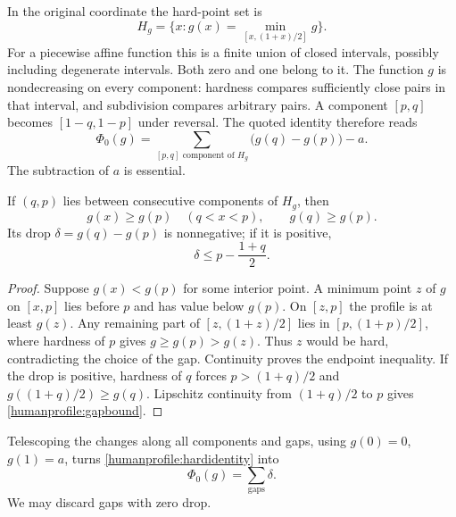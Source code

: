 In the original coordinate the hard-point set is
\[
 H_g=\{x:g(x)=\min_{[x,(1+x)/2]}g\}.
\]
For a piecewise affine function this is a finite union of closed intervals,
possibly including degenerate intervals. Both zero and one belong to it.
The function \(g\) is nondecreasing on every component: hardness compares
sufficiently close pairs in that interval, and subdivision compares
arbitrary pairs. A component \([p,q]\) becomes
\([1-q,1-p]\) under reversal. The quoted identity therefore reads
\begin{equation}\label{humanprofile:hardidentity}
 \Phi_0(g)=
 \sum_{[p,q]\text{ component of }H_g}\bigl(g(q)-g(p)\bigr)-a.
\end{equation}
The subtraction of \(a\) is essential.

\begin{lemma}\label{humanprofile:gap}
If \((q,p)\) lies between consecutive components of \(H_g\), then
\[
 g(x)\ge g(p)\quad(q<x<p),\qquad g(q)\ge g(p).
\]
Its drop \(\delta=g(q)-g(p)\) is nonnegative; if it is positive,
\begin{equation}\label{humanprofile:gapbound}
 \delta\le p-\frac{1+q}{2}.
\end{equation}
\end{lemma}
\begin{proof}
Suppose \(g(x)<g(p)\) for some interior point. A minimum point \(z\)
of \(g\) on \([x,p]\) lies before \(p\) and has value below \(g(p)\).
On \([z,p]\) the profile is at least \(g(z)\). Any remaining part
of \([z,(1+z)/2]\) lies in \([p,(1+p)/2]\), where hardness of
\(p\) gives \(g\ge g(p)>g(z)\). Thus \(z\) would be hard,
contradicting the choice of the gap. Continuity proves the endpoint
inequality. If the drop is positive, hardness of \(q\) forces
\(p>(1+q)/2\) and \(g((1+q)/2)\ge g(q)\). Lipschitz
continuity from \((1+q)/2\) to \(p\) gives
\eqref{humanprofile:gapbound}.
\end{proof}

Telescoping the changes along all components and gaps, using
\(g(0)=0\), \(g(1)=a\), turns \eqref{humanprofile:hardidentity} into
\begin{equation}\label{humanprofile:drops}
 \Phi_0(g)=\sum_{\text{gaps}}\delta.
\end{equation}
We may discard gaps with zero drop.

